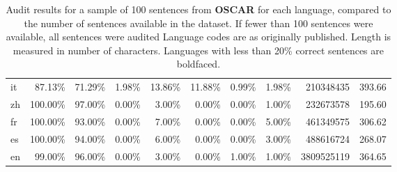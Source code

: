 \begin{table*}[hbt!]
{\begin{tabular}{l|rrrr|rrr|rr}
            it           & 87.13\%  & 71.29\%  & 1.98\% & 13.86\% & 11.88\%  & 0.99\%   & 1.98\% & 210348435    & 393.66     \\
            zh           & 100.00\% & 97.00\%  & 0.00\% & 3.00\%  & 0.00\%   & 0.00\%   & 1.00\% & 232673578    & 195.60     \\
            fr           & 100.00\% & 93.00\%  & 0.00\% & 7.00\%  & 0.00\%   & 0.00\%   & 5.00\% & 461349575    & 306.62     \\
            es           & 100.00\% & 94.00\%  & 0.00\% & 6.00\%  & 0.00\%   & 0.00\%   & 3.00\% & 488616724    & 268.07     \\
            en           & 99.00\%  & 96.00\%  & 0.00\% & 3.00\%  & 0.00\%   & 1.00\%   & 1.00\% & 3809525119   & 364.65     \\
            \bottomrule
        \end{tabular}%
    }
    \caption{Audit results for a sample of 100 sentences from \textbf{OSCAR} for each language, compared to the number of sentences available in the dataset. If fewer than 100 sentences were available, all sentences were audited Language codes are as originally published. Length is measured in number of characters. Languages with less than 20\% correct sentences are boldfaced.}
    \label{tab:oscar-full}
\end{table*}




